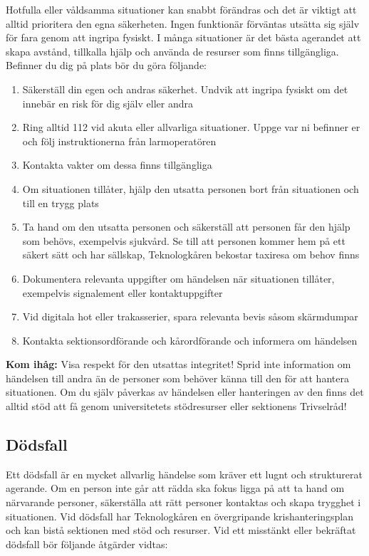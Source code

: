 \documentclass[pdfbookmarks,a4paper,11pt]{article}
\begin{document}
Hotfulla eller våldsamma situationer kan snabbt förändras och det är viktigt att alltid prioritera den egna säkerheten. Ingen funktionär förväntas utsätta sig själv för fara genom att ingripa fysiskt. I många situationer är det bästa agerandet att skapa avstånd, tillkalla hjälp och använda de resurser som finns tillgängliga. Befinner du dig på plats bör du göra följande:

\begin{enumerate}
    \item Säkerställ din egen och andras säkerhet. Undvik att ingripa fysiskt om det innebär en risk för dig själv eller andra
    \item Ring alltid 112 vid akuta eller allvarliga situationer. Uppge var ni befinner er och följ instruktionerna från larmoperatören
    \item Kontakta vakter om dessa finns tillgängliga
    \item Om situationen tillåter, hjälp den utsatta personen bort från situationen och till en trygg plats
    \item Ta hand om den utsatta personen och säkerställ att personen får den hjälp som behövs, exempelvis sjukvård. Se till att personen kommer hem på ett säkert sätt och har sällskap, Teknologkåren bekostar taxiresa om behov finns
    \item Dokumentera relevanta uppgifter om händelsen när situationen tillåter, exempelvis signalement eller kontaktuppgifter
    \item Vid digitala hot eller trakasserier, spara relevanta bevis såsom skärmdumpar
    \item Kontakta sektionsordförande och kårordförande och informera om händelsen
\end{enumerate}

\textbf{Kom ihåg:} Visa respekt för den utsattas integritet! Sprid inte information om händelsen till andra än de personer som behöver känna till den för att hantera situationen. Om du själv påverkas av händelsen eller hanteringen av den finns det alltid stöd att få genom universitetets stödresurser eller sektionens Trivselråd!

\subsection{Dödsfall}

Ett dödsfall är en mycket allvarlig händelse som kräver ett lugnt och strukturerat agerande. Om en person inte går att rädda ska fokus ligga på att ta hand om närvarande personer, säkerställa att rätt personer kontaktas och skapa trygghet i situationen. Vid dödsfall har Teknologkåren en övergripande krishanteringsplan och kan bistå sektionen med stöd och resurser. Vid ett misstänkt eller bekräftat dödsfall bör följande åtgärder vidtas:
\end{document}
